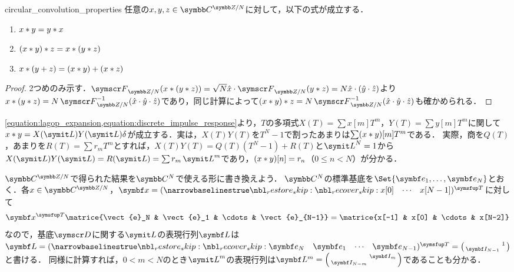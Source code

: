 \documentclass[../../main]{subfiles}
\begin{document}
\begin{corollary}{}{circular_convolution_properties}
  任意の\(x,y,z\in\cycles{\numset{C}}{N}\)に対して，以下の式が成立する．
  \begin{enumerate}
    \item \(x\ast y=y\ast x\)
    \item \((x\ast y)\ast z=x\ast (y\ast z)\)
    \item \(x\ast(y+z)=(x\ast y)+(x\ast z)\)
  \end{enumerate}
\end{corollary}

\begin{proof}
  2つめのみ示す．\(\dft{N}(x\circconv (y\circconv z))=\sqrt{N}\hat{x}\cdot\dft{N}(y\circconv z)=N\hat{x}\cdot(\hat{y}\cdot\hat{z})\)より
  \(x\circconv(y\circconv z)=N\dft{N}^{-1}(\hat{x}\cdot\hat{y}\cdot\hat{z})\)であり，同じ計算によって\((x\circconv y)\circconv z=N\dft{N}^{-1}(\hat{x}\cdot\hat{y}\cdot\hat{z})\)も確かめられる．
\end{proof}

\begin{note}
  \cref{equation:lagop_expansion,equation:discrete_impulse_response}より，\(T\)の多項式\(X(T)=\sum x[m]T^m\)，\(Y(T)=\sum y[m]T^m\)に関して\(x\circconv y=X(\lagop)Y(\lagop)\delta\)が成立する．実は，\(X(T)Y(T)\)を\(T^N-1\)で割ったあまりは\(\sum(x\ast y)[m]T^m\)である．
  実際，商を\(Q(T)\)，あまりを\(R(T)=\sum r_mT^m\)とすれば，\(X(T)Y(T)=Q(T)(T^N-1)+R(T)\)と\(\lagop^N=1\)から\(X(\lagop)Y(\lagop)=R(\lagop)=\sum r_m\lagop^m\)であり，\((x\ast y)[n]=r_n\)（\(0\leq n<N\)）が分かる．
\end{note}

\(\cycles{\numset{C}}{N}\)で得られた結果を\(\numset{C}^N\)で使える形に書き換えよう．
\(\numset{C}^N\)の標準基底を\(\Set{\vect{e}_1,\dots,\vect{e}_N}\)とおく．各\(x\in\cycles{\numset{C}}{N}\)，\(\vect{x}=\trps{\rowvect{x[0] & \cdots & x[N-1]}}\)に対して
\[
  \trps{\vect{x}}\matrice{\vect{e}_N & \vect{e}_1 & \cdots & \vect{e}_{N-1}}
  = \matrice{x[-1] & x[0] & \cdots & x[N-2]}
\]
なので，基底\(\basis{D}\)に関する\(\lagop\)の表現行列\(\mat{L}\)は\(\mat{L}=\trps{\rowvect{\vect{e}_N & \vect{e}_1 & \cdots & \vect{e}_{N-1}}}=\smallmatrice{ & 1 \\ \imat_{N-1} & }\)と書ける．
同様に計算すれば，\(0<m<N\)のとき\(\lagop^m\)の表現行列は\(\mat{L}^m=\smallmatrice{ & \imat_m \\ \imat_{N-m} & }\)であることも分かる．
\end{document}
